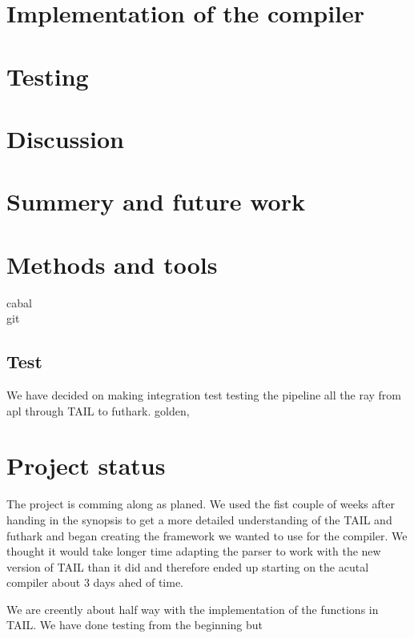 \documentclass[11pt]{article}
\begin{document}
\section{Implementation of the compiler}

\section{Testing}

\section{Discussion}

\section{Summery and future work}

\section{Methods and tools}

cabal\\
git\\
\subsection{Test}
We have decided on making integration test testing the pipeline all the ray from apl through TAIL to futhark.
golden, \\

\section{Project status}
The project is comming along as planed. We used the fist couple of weeks after handing in the synopsis to get a more detailed understanding of the TAIL and futhark and began creating the framework we wanted to use for the compiler. 
We thought it would take longer time adapting the parser to work with the new version of TAIL than it did and therefore ended up starting on the acutal compiler about 3 days ahed of time. 

We are creently about half way with the implementation of the functions in TAIL. We have done testing from the beginning but 

\end{document}
